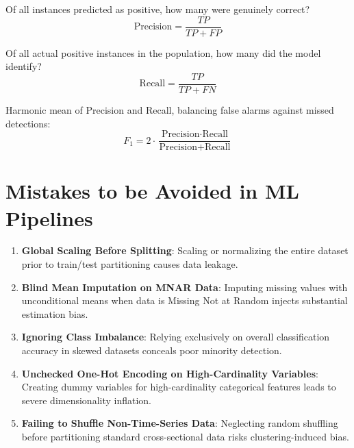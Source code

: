 \begin{formulabox}[Precision]
Of all instances predicted as positive, how many were genuinely correct?
\begin{equation}
\text{Precision} = \frac{TP}{TP + FP}
\end{equation}
\end{formulabox}

\begin{formulabox}[Recall]
Of all actual positive instances in the population, how many did the model identify?
\begin{equation}
\text{Recall} = \frac{TP}{TP + FN}
\end{equation}
\end{formulabox}

\begin{formulabox}[$F_1$-Score]
Harmonic mean of Precision and Recall, balancing false alarms against missed detections:
\begin{equation}
F_1 = 2 \cdot \frac{\text{Precision} \cdot \text{Recall}}{\text{Precision} + \text{Recall}}
\end{equation}
\end{formulabox}

\section{Mistakes to be Avoided in ML Pipelines}

\begin{enumerate}[leftmargin=1.5em]
    \item \textbf{Global Scaling Before Splitting}: Scaling or normalizing the entire dataset prior to train/test partitioning causes data leakage.
    \item \textbf{Blind Mean Imputation on MNAR Data}: Imputing missing values with unconditional means when data is Missing Not at Random injects substantial estimation bias.
    \item \textbf{Ignoring Class Imbalance}: Relying exclusively on overall classification accuracy in skewed datasets conceals poor minority detection.
    \item \textbf{Unchecked One-Hot Encoding on High-Cardinality Variables}: Creating dummy variables for high-cardinality categorical features leads to severe dimensionality inflation.
    \item \textbf{Failing to Shuffle Non-Time-Series Data}: Neglecting random shuffling before partitioning standard cross-sectional data risks clustering-induced bias.
\end{enumerate}

